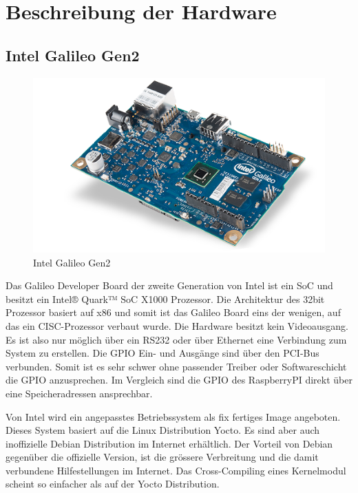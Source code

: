 \section{Beschreibung der Hardware}

\subsection{Intel Galileo Gen2}

\begin{figure}
\centering
\includegraphics[scale=0.5]{iot_galileo.png}
\caption{Intel Galileo Gen2\cite{intel_galileo_image}}
\label{fig:Intel Galileo Gen2}
\end{figure}

Das Galileo Developer Board\cite{intel_datasheet_galileo} der zweite Generation von
Intel ist ein SoC und besitzt ein Intel® Quark™ SoC X1000 Prozessor. Die Architektur des 32bit Prozessor basiert auf x86\cite{intel_datasheet} und somit ist das Galileo
Board eins der wenigen, auf das ein CISC-Prozessor verbaut wurde. Die Hardware
besitzt kein Videoausgang. Es ist also nur möglich über ein RS232 oder über Ethernet
eine Verbindung zum System zu erstellen. Die GPIO Ein- und Ausgänge sind über den
PCI-Bus verbunden. Somit ist es sehr schwer ohne passender Treiber oder
Softwareschicht die GPIO anzusprechen. Im Vergleich sind die GPIO des RaspberryPI
direkt über eine Speicheradressen ansprechbar.
\par
Von Intel wird ein angepasstes Betriebssystem als fix fertiges Image angeboten. Dieses System basiert auf
die Linux Distribution Yocto. Es sind aber auch inoffizielle Debian Distribution im
Internet erhältlich. Der Vorteil von Debian gegenüber die offizielle Version, ist die
grössere Verbreitung und die damit verbundene Hilfestellungen im Internet. Das Cross-Compiling eines Kernelmodul scheint so einfacher als auf der Yocto Distribution.


